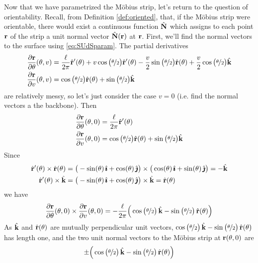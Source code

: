 \begin{eg}
Now that we have parametrized the M\"obius strip, let's return to
the question of orientability. Recall, from Definition \ref{def:oriented},
that, if the M\"obius strip were orientable, there would exist a continuous
function $\hat{\mathbf{N}}$ which assigns to each point $\mathbf{r}$ of the strip a unit 
normal vector $\hat{\mathbf{N}}(\mathbf{r})$ at $\mathbf{r}$. First, we'll find the normal vectors
to the surface using \eqref{eq:SUdSparam}. The partial derivatives
\begin{align*}
\frac{\partial\mathbf{r}}{\partial\theta}(\theta,v)
&=\frac{\ell}{2\pi}\hat{\mathbf{r}}'(\theta) 
     + v\cos\big(\nicefrac{\theta}{2}\big) \hat{\mathbf{r}}'(\theta)
     - \frac{v}{2}\sin\big(\nicefrac{\theta}{2}\big) \hat{\mathbf{r}}(\theta)
     + \frac{v}{2}\cos\big(\nicefrac{\theta}{2}\big) \hat{\mathbf{k}}
\\
\frac{\partial\mathbf{r}}{\partial v}(\theta,v)
&=\cos\big(\nicefrac{\theta}{2}\big) \hat{\mathbf{r}}(\theta)
      + \sin\big(\nicefrac{\theta}{2}\big) \hat{\mathbf{k}}
\end{align*}
are relatively messy, so let's just consider the case $v=0$ 
(i.e. find the normal vectors a the backbone).
Then
\begin{align*}
\frac{\partial\mathbf{r}}{\partial\theta}(\theta,0)
&=\frac{\ell}{2\pi}\hat{\mathbf{r}}'(\theta) 
\\
\frac{\partial\mathbf{r}}{\partial v}(\theta,0)
&=\cos\big(\nicefrac{\theta}{2}\big) \hat{\mathbf{r}}(\theta)
      + \sin\big(\nicefrac{\theta}{2}\big) \hat{\mathbf{k}}
\end{align*}
Since
\begin{align*}
\hat{\mathbf{r}}'(\theta)\times \hat{\mathbf{r}}(\theta)
&=\big(-\sin(\theta)\,\hat{\pmb{\imath}} + \cos(\theta)\,\hat{\pmb{\jmath}}\big)\times
   \big(\cos(\theta)\,\hat{\pmb{\imath}} + \sin(\theta)\,\hat{\pmb{\jmath}}\big)
=-\hat{\mathbf{k}}
\\
\hat{\mathbf{r}}'(\theta)\times \hat{\mathbf{k}}
&=\big(-\sin(\theta)\,\hat{\pmb{\imath}} + \cos(\theta)\,\hat{\pmb{\jmath}}\big)\times \hat{\mathbf{k}}
=\hat{\mathbf{r}}(\theta)
\end{align*}
we have
\begin{align*}
\frac{\partial\mathbf{r}}{\partial\theta}(\theta,0) \times 
\frac{\partial\mathbf{r}}{\partial v}(\theta,0)
=-\frac{\ell}{2\pi}\Big(\cos\big(\nicefrac{\theta}{2}\big)\,\hat{\mathbf{k}}
                       -\sin\big(\nicefrac{\theta}{2}\big)\,\hat{\mathbf{r}}(\theta) \Big)
\end{align*}
As $\hat{\mathbf{k}}$ and $\hat{\mathbf{r}}(\theta)$ are mutually perpendicular unit vectors,
$\cos\big(\nicefrac{\theta}{2}\big)\,\hat{\mathbf{k}}
                       -\sin\big(\nicefrac{\theta}{2}\big)\,\hat{\mathbf{r}}(\theta)$ 
has length one, and the two unit normal vectors to the M\"obius strip
at $\mathbf{r}(\theta,0)$ are
\begin{equation*}
\pm \Big(\cos\big(\nicefrac{\theta}{2}\big)\,\hk
                       -\sin\big(\nicefrac{\theta}{2}\big)\,\hr(\theta) \Big)

\end{equation*}
\end{eg}
